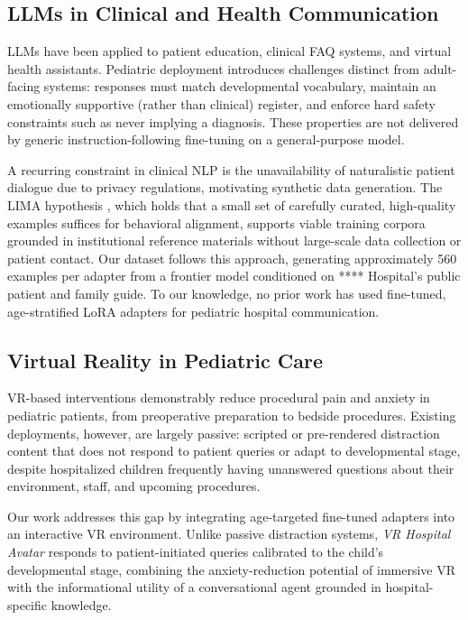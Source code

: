\documentclass[ASNA,twocolumn]{USG} %
\begin{document}
\subsection{LLMs in Clinical and Health Communication}

LLMs have been applied to patient education, clinical FAQ systems, and virtual health assistants. Pediatric deployment introduces challenges distinct from adult-facing systems: responses must match developmental vocabulary, maintain an emotionally supportive (rather than clinical) register, and enforce hard safety constraints such as never implying a diagnosis. These properties are not delivered by generic instruction-following fine-tuning on a general-purpose model.

A recurring constraint in clinical NLP is the unavailability of naturalistic patient dialogue due to privacy regulations, motivating synthetic data generation. The LIMA hypothesis \cite{zhou2023lima}, which holds that a small set of carefully curated, high-quality examples suffices for behavioral alignment, supports viable training corpora grounded in institutional reference materials without large-scale data collection or patient contact. Our dataset follows this approach, generating approximately 560 examples per adapter from a frontier model conditioned on **** Hospital's public patient and family guide. To our knowledge, no prior work has used fine-tuned, age-stratified LoRA adapters for pediatric hospital communication.

\subsection{Virtual Reality in Pediatric Care}

VR-based interventions demonstrably reduce procedural pain and anxiety in pediatric patients, from preoperative preparation to bedside procedures. Existing deployments, however, are largely passive: scripted or pre-rendered distraction content that does not respond to patient queries or adapt to developmental stage, despite hospitalized children frequently having unanswered questions about their environment, staff, and upcoming procedures.

Our work addresses this gap by integrating age-targeted fine-tuned adapters into an interactive VR environment. Unlike passive distraction systems, \textit{VR Hospital Avatar} responds to patient-initiated queries calibrated to the child's developmental stage, combining the anxiety-reduction potential of immersive VR with the informational utility of a conversational agent grounded in hospital-specific knowledge.
\end{document}
